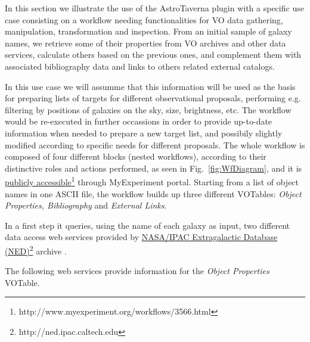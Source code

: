 \documentclass{aa}
\begin{document}
In this section we illustrate the use of the AstroTaverna plugin with a specific use case consisting on a workflow needing functionalities for VO data gathering, manipulation, transformation and inspection. From an initial sample of galaxy names, we retrieve some of their properties from VO archives and other data services, calculate others based on the previous ones, and complement them with associated bibliography data and links to others related external catalogs.

In this use case we will assumme that this information will be used as the basis for preparing lists of targets for different observational proposals, performing e.g. filtering by positions of galaxies on the sky, size, brightness, etc. The workflow would be re-executed in further occassions in order to provide up-to-date information when needed to prepare a new target list, and possibily slightly modified according to specific needs for different proposals. The whole workflow is composed of four different blocks (nested workflows), according to their distinctive roles and actions performed, as seen in Fig.~\ref{fig:WfDiagram}, and it is \href{http://www.myexperiment.org/workflows/3566.html}{publicly accessible}\footnote{http://www.myexperiment.org/workflows/3566.html} through MyExperiment portal. Starting from a list of object names in one ASCII file, the workflow builds up three different VOTables: \textit{Object Properties, Bibliography} and \textit{External Links}.

In a first step it queries, using the name of each galaxy as input, two different data access web services provided by \href{http://ned.ipac.caltech.edu}{NASA/IPAC Extragalactic Database (NED)}\footnote{http://ned.ipac.caltech.edu} archive \citep{Mazzarella2008}.

The following web services provide information for the \textit{Object Properties} VOTable.
\end{document}
